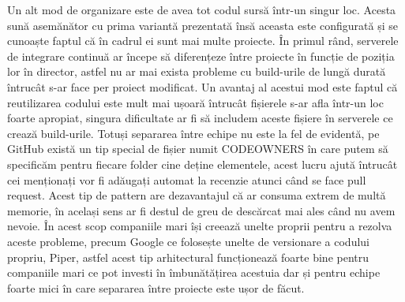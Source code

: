 Un alt mod de organizare este de avea tot codul sursă într-un singur loc. Acesta sună asemănător
cu prima variantă prezentată însă aceasta este configurată și se cunoaște faptul că în cadrul
ei sunt mai multe proiecte. În primul rând, serverele de integrare continuă ar începe să diferențeze
între proiecte în funcție de poziția lor în director, astfel nu ar mai exista probleme cu
build-urile de lungă durată întrucât s-ar face per proiect modificat. Un avantaj al acestui
mod este faptul că reutilizarea codului este mult mai ușoară întrucât fișierele s-ar afla 
într-un loc foarte apropiat, singura dificultate ar fi să includem aceste fișiere în
serverele ce crează build-urile. Totuși separarea între echipe nu este la fel de evidentă,
pe GitHub există un tip special de fișier numit CODEOWNERS în care putem să specificăm 
pentru fiecare folder cine deține elementele, acest lucru ajută întrucât cei menționați
vor fi adăugați automat la recenzie atunci când se face pull request. Acest tip de pattern
are dezavantajul că ar consuma extrem de multă memorie, în același sens ar fi destul de greu
de descărcat mai ales când nu avem nevoie. În acest scop companiile mari își creează unelte
proprii pentru a rezolva aceste probleme, precum Google ce folosește unelte de versionare
a codului propriu, Piper, astfel acest tip arhitectural funcționează foarte bine pentru companiile
mari ce pot investi în îmbunătățirea acestuia dar și pentru echipe foarte mici în care 
separarea între proiecte este ușor de făcut.
